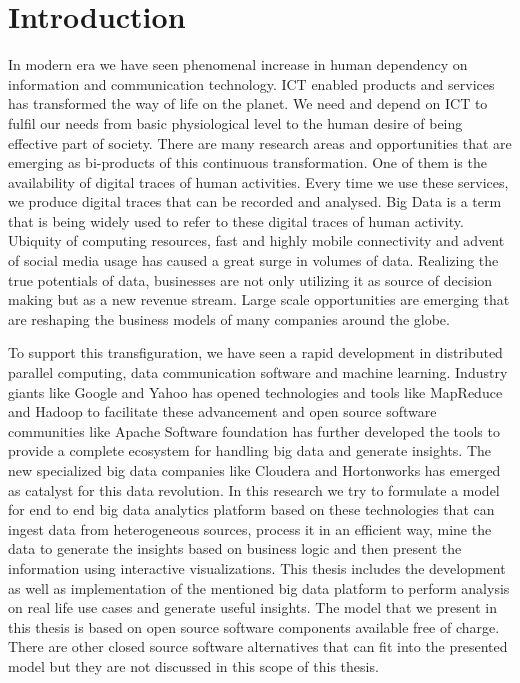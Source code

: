 \setcounter{page}{1}
\chapter{Introduction}
\label{chapter:intro}

 In modern era we have seen phenomenal increase in human dependency on information and communication technology. ICT enabled products and services has transformed the way of life on the planet. We need and depend on ICT to fulfil our needs from basic physiological level to the human desire of being effective part of society. There are many research areas and opportunities that are emerging as bi-products of this continuous transformation. One of them is the availability of digital traces of human activities. Every time we use these services, we produce digital traces that can be recorded and analysed. Big Data is a term that is being widely used to refer to these digital traces of human activity. Ubiquity of computing resources, fast and highly mobile connectivity and advent of social media usage has caused a great surge in volumes of data. Realizing the true potentials of data, businesses are not only utilizing it as source of decision making but as a new revenue stream. Large scale opportunities are emerging that are reshaping the business models of many companies around the globe.
 
To support this transfiguration, we have seen a rapid development in distributed parallel computing, data communication software and machine learning. Industry giants like Google and Yahoo has opened technologies and tools like MapReduce and Hadoop to facilitate these advancement and open source software communities like Apache Software foundation has further developed the tools to provide a complete ecosystem for handling big data and generate insights. The new specialized big data companies like Cloudera and Hortonworks has emerged as catalyst for this data revolution. In this research we try to formulate a model for end to end big data analytics platform based on these technologies that can ingest data from heterogeneous sources, process it in an efficient way, mine the data to generate the insights based on business logic and then present the information using interactive visualizations. This thesis includes the development as well as implementation of the mentioned big data platform to perform analysis on real life use cases and generate useful insights. The model that we present in this thesis is based on open source software components available free of charge. There are other closed source software alternatives that can fit into the presented model but they are not discussed in this scope of this thesis.

